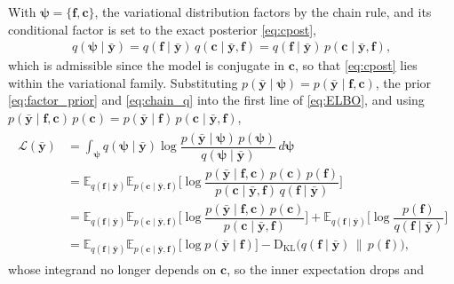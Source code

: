 \documentclass[journal,onecolumn]{IEEEtran}
\begin{document}
With $\pmb{\psi}=\{\mathbf{f},\mathbf{c}\}$, the variational distribution factors by the chain rule, and its conditional factor is set to the exact posterior \eqref{eq:cpost},
\begin{eqnarray}
\label{eq:chain_q}
q(\pmb{\psi}\mid\bar{\mathbf{y}})=q(\mathbf{f}\mid\bar{\mathbf{y}})\,q(\mathbf{c}\mid\bar{\mathbf{y}},\mathbf{f})
=q(\mathbf{f}\mid\bar{\mathbf{y}})\,p(\mathbf{c}\mid\bar{\mathbf{y}},\mathbf{f}),
\end{eqnarray}
which is admissible since the model is conjugate in $\mathbf{c}$, so that \eqref{eq:cpost} lies within the variational family. Substituting $p(\bar{\mathbf{y}}\mid\pmb{\psi})=p(\bar{\mathbf{y}}\mid\mathbf{f},\mathbf{c})$, the prior \eqref{eq:factor_prior} and \eqref{eq:chain_q} into the first line of \eqref{eq:ELBO}, and using $p(\bar{\mathbf{y}}\mid\mathbf{f},\mathbf{c})\,p(\mathbf{c})=p(\bar{\mathbf{y}}\mid\mathbf{f})\,p(\mathbf{c}\mid\bar{\mathbf{y}},\mathbf{f})$,
\begin{eqnarray}
\label{eq:elbo_reduce}
    \begin{array}{rl}
     \mathcal{L}(\bar{\mathbf{y}})
     & = \displaystyle\int_{\pmb{\psi}} q(\pmb{\psi}\mid\bar{\mathbf{y}})
         \log\dfrac{p(\bar{\mathbf{y}}\mid\pmb{\psi})\,p(\pmb{\psi})}{q(\pmb{\psi}\mid\bar{\mathbf{y}})}\,d\pmb{\psi} \\[12pt]
     & = \mathbb{E}_{q(\mathbf{f}\mid\bar{\mathbf{y}})}
         \mathbb{E}_{p(\mathbf{c}\mid\bar{\mathbf{y}},\mathbf{f})}\Big[
         \log\dfrac{p(\bar{\mathbf{y}}\mid\mathbf{f},\mathbf{c})\,p(\mathbf{c})\,p(\mathbf{f})}
                   {p(\mathbf{c}\mid\bar{\mathbf{y}},\mathbf{f})\,q(\mathbf{f}\mid\bar{\mathbf{y}})}\Big] \\[12pt]
     & = \mathbb{E}_{q(\mathbf{f}\mid\bar{\mathbf{y}})}
         \mathbb{E}_{p(\mathbf{c}\mid\bar{\mathbf{y}},\mathbf{f})}\Big[
         \log\dfrac{p(\bar{\mathbf{y}}\mid\mathbf{f},\mathbf{c})\,p(\mathbf{c})}{p(\mathbf{c}\mid\bar{\mathbf{y}},\mathbf{f})}\Big]
       + \mathbb{E}_{q(\mathbf{f}\mid\bar{\mathbf{y}})}\Big[\log\dfrac{p(\mathbf{f})}{q(\mathbf{f}\mid\bar{\mathbf{y}})}\Big] \\[12pt]
     & = \mathbb{E}_{q(\mathbf{f}\mid\bar{\mathbf{y}})}
         \mathbb{E}_{p(\mathbf{c}\mid\bar{\mathbf{y}},\mathbf{f})}\big[\log p(\bar{\mathbf{y}}\mid\mathbf{f})\big]
       - \mathrm{D}_{\mathrm{KL}}\big(q(\mathbf{f}\mid\bar{\mathbf{y}}) \,\big\|\, p(\mathbf{f})\big),
    \end{array}
\end{eqnarray}
whose integrand no longer depends on $\mathbf{c}$, so the inner expectation drops and
\end{document}
